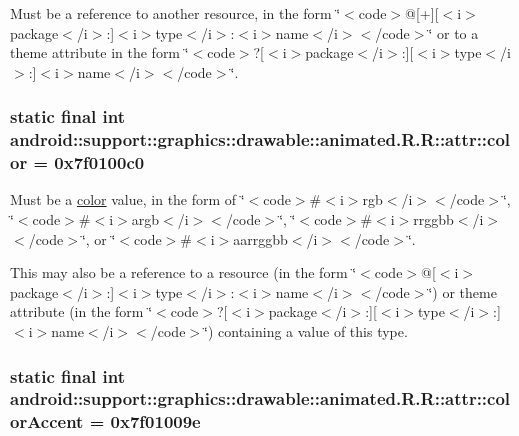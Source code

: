 Must be a reference to another resource, in the form \char`\"{}$<$code$>$@\mbox{[}+\mbox{]}\mbox{[}$<$i$>$package$<$/i$>$:\mbox{]}$<$i$>$type$<$/i$>$:$<$i$>$name$<$/i$>$$<$/code$>$\char`\"{} or to a theme attribute in the form \char`\"{}$<$code$>$?\mbox{[}$<$i$>$package$<$/i$>$:\mbox{]}\mbox{[}$<$i$>$type$<$/i$>$:\mbox{]}$<$i$>$name$<$/i$>$$<$/code$>$\char`\"{}. \hypertarget{classandroid_1_1support_1_1graphics_1_1drawable_1_1animated_1_1_r_1_1attr_196d4959f3e72768259ef2a42e6b164e}{
\subsubsection[{color}]{\setlength{\rightskip}{0pt plus 5cm}static final int android::support::graphics::drawable::animated.R.R::attr::color = 0x7f0100c0}}
\label{classandroid_1_1support_1_1graphics_1_1drawable_1_1animated_1_1_r_1_1attr_196d4959f3e72768259ef2a42e6b164e}


Must be a \hyperlink{classandroid_1_1support_1_1graphics_1_1drawable_1_1animated_1_1_r_1_1color}{color} value, in the form of \char`\"{}$<$code$>$\#$<$i$>$rgb$<$/i$>$$<$/code$>$\char`\"{}, \char`\"{}$<$code$>$\#$<$i$>$argb$<$/i$>$$<$/code$>$\char`\"{}, \char`\"{}$<$code$>$\#$<$i$>$rrggbb$<$/i$>$$<$/code$>$\char`\"{}, or \char`\"{}$<$code$>$\#$<$i$>$aarrggbb$<$/i$>$$<$/code$>$\char`\"{}. 

This may also be a reference to a resource (in the form \char`\"{}$<$code$>$@\mbox{[}$<$i$>$package$<$/i$>$:\mbox{]}$<$i$>$type$<$/i$>$:$<$i$>$name$<$/i$>$$<$/code$>$\char`\"{}) or theme attribute (in the form \char`\"{}$<$code$>$?\mbox{[}$<$i$>$package$<$/i$>$:\mbox{]}\mbox{[}$<$i$>$type$<$/i$>$:\mbox{]}$<$i$>$name$<$/i$>$$<$/code$>$\char`\"{}) containing a value of this type. \hypertarget{classandroid_1_1support_1_1graphics_1_1drawable_1_1animated_1_1_r_1_1attr_a2c5ce33421939aefce4d10816b43204}{
\subsubsection[{colorAccent}]{\setlength{\rightskip}{0pt plus 5cm}static final int android::support::graphics::drawable::animated.R.R::attr::colorAccent = 0x7f01009e}}
\label{classandroid_1_1support_1_1graphics_1_1drawable_1_1animated_1_1_r_1_1attr_a2c5ce33421939aefce4d10816b43204}


